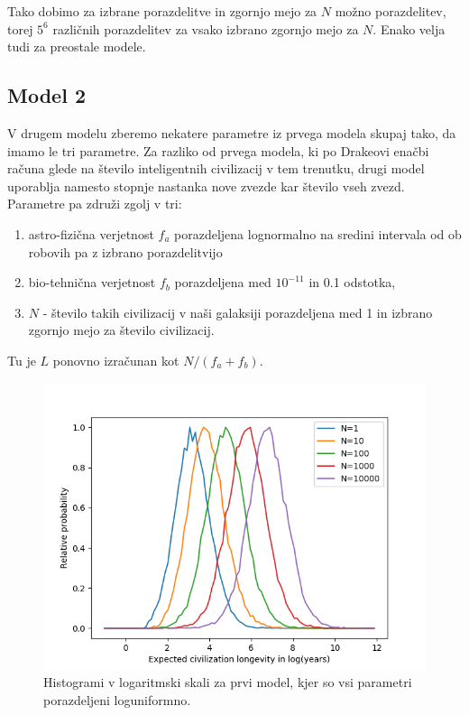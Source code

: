 \documentclass[a4paper]{IEEEtran}
\begin{document}
Tako dobimo za izbrane porazdelitve in zgornjo mejo za $N$ možno porazdelitev, torej $5^6$ različnih porazdelitev za vsako izbrano zgornjo mejo za $N$. Enako velja tudi za preostale modele.








\subsection{Model 2}

V drugem modelu zberemo nekatere parametre iz prvega modela skupaj tako, da imamo le tri parametre. Za razliko od prvega modela, ki po Drakeovi enačbi računa glede na število inteligentnih civilizacij v tem trenutku, drugi model uporablja namesto stopnje nastanka nove zvezde kar število vseh zvezd. Parametre pa združi zgolj v tri:
\begin{enumerate}
	\item astro-fizična verjetnost $f_a$ porazdeljena lognormalno na sredini intervala od  ob robovih pa z izbrano porazdelitvijo
	\item bio-tehnična verjetnost $f_b$ porazdeljena med $10^{-11}$ in 0.1 odstotka,
	\item $N$ - število takih civilizacij v naši galaksiji porazdeljena med 1 in izbrano zgornjo mejo za število civilizacij.
\end{enumerate}

Tu je $L$ ponovno izračunan kot $N / (f_a + f_b)$.

\begin{figure}[!h]
	\centering
	\includegraphics[width=0.7\linewidth]{Figures/log_model2}
	\caption{Histogrami v logaritmski skali za prvi model, kjer so vsi parametri porazdeljeni loguniformno.}
	\label{fig:model2}
\end{figure}
\end{document}
